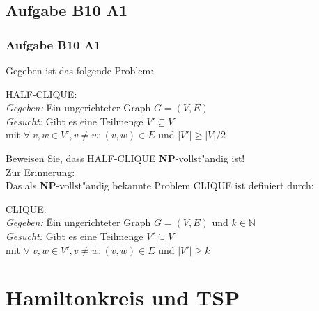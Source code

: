 \subsection{Aufgabe B10 A1}
\begin{frame}
	\frametitle{Aufgabe B10 A1}
	Gegeben ist das folgende Problem:
	\begin{tabbing}
	HALF-CLIQUE:\\
	\textit{Gegeben:} \= Ein ungerichteter Graph $G = (V,E)$\\
	\textit{Gesucht:} \> Gibt es eine Teilmenge $V' \subseteq V$\\
	\> mit	$\forall \; v,w \in V', v \not= w: (v,w) \in E$ und $|V'| \geq |V|/2$
	\end{tabbing}
	Beweisen Sie, dass HALF-CLIQUE \textbf{NP}-vollst"andig ist!\\[4pt]
	\underline{Zur Erinnerung:}\\
	Das als \textbf{NP}-vollst"andig bekannte Problem CLIQUE ist definiert durch:
	\begin{tabbing}
	CLIQUE:\\
	\textit{Gegeben:} \= Ein ungerichteter Graph $G = (V,E)$ und $k \in \mathbb{N}$\\
	\textit{Gesucht:} \> Gibt es eine Teilmenge $V' \subseteq V$\\
	\> mit	$\forall \; v,w \in V', v \not= w: (v,w) \in E$ und $|V'| \geq k$
	\end{tabbing}
\end{frame}

\section{Hamiltonkreis und TSP}
